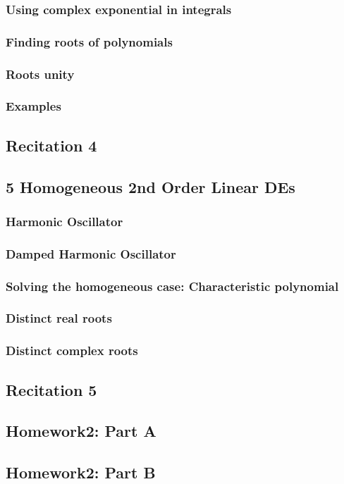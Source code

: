 \documentclass[8pt, a4paper]{article}
\begin{document}
\subsubsection{Using complex exponential in integrals}
\subsubsection{Finding roots of polynomials}
\subsubsection{Roots unity}
\subsubsection{Examples}

\subsection{Recitation 4}

\subsection{5 Homogeneous 2nd Order Linear DEs}
\subsubsection{Harmonic Oscillator}
\subsubsection{Damped Harmonic Oscillator}
\subsubsection{Solving the homogeneous case: Characteristic polynomial}
\subsubsection{Distinct real roots}
\subsubsection{Distinct complex roots}

\subsection{Recitation 5}

\subsection{Homework2: Part A}

\subsection{Homework2: Part B}
\end{document}
